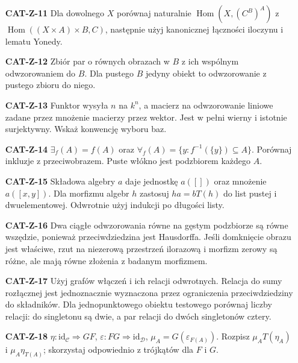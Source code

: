 \documentclass[11pt,a4paper]{article}
\newcommand{\Hom}{\operatorname{Hom}}
\newcommand{\id}{\mathrm{id}}
\begin{document}
\begin{enumerate}
\item[\textbf{CAT-Z-11}] Dla dowolnego $X$ porównaj naturalnie $\Hom(X,(C^B)^A)$ z $\Hom((X\times A)\times B,C)$, następnie użyj kanonicznej łączności iloczynu i lematu Yonedy.
\item[\textbf{CAT-Z-12}] Zbiór par o równych obrazach w $B$ z ich wspólnym odwzorowaniem do $B$. Dla pustego $B$ jedyny obiekt to odwzorowanie z pustego zbioru do niego.
\item[\textbf{CAT-Z-13}] Funktor wysyła $n$ na $k^n$, a macierz na odwzorowanie liniowe zadane przez mnożenie macierzy przez wektor. Jest w pełni wierny i istotnie surjektywny. Wskaż konwencję wyboru baz.
\item[\textbf{CAT-Z-14}] $\exists_f(A)=f(A)$ oraz $\forall_f(A)=\{y:f^{-1}(\{y\})\subseteq A\}$. Porównaj inkluzje z przeciwobrazem. Puste włókno jest podzbiorem każdego $A$.
\item[\textbf{CAT-Z-15}] Składowa algebry $a$ daje jednostkę $a([])$ oraz mnożenie $a([x,y])$. Dla morfizmu algebr $h$ zastosuj $ha=bT(h)$ do list pustej i dwuelementowej. Odwrotnie użyj indukcji po długości listy.
\item[\textbf{CAT-Z-16}] Dwa ciągłe odwzorowania równe na gęstym podzbiorze są równe wszędzie, ponieważ przeciwdziedzina jest Hausdorffa. Jeśli domknięcie obrazu jest właściwe, rzut na niezerową przestrzeń ilorazową i morfizm zerowy są różne, ale mają równe złożenia z badanym morfizmem.
\item[\textbf{CAT-Z-17}] Użyj grafów włączeń i ich relacji odwrotnych. Relacja do sumy rozłącznej jest jednoznacznie wyznaczona przez ograniczenia przeciwdziedziny do składników. Dla jednopunktowego obiektu testowego porównaj liczby relacji: do singletonu są dwie, a par relacji do dwóch singletonów cztery.
\item[\textbf{CAT-Z-18}] $\eta:\id_{\mathcal C}\Rightarrow GF$, $\varepsilon:FG\Rightarrow\id_{\mathcal D}$, $\mu_A=G(\varepsilon_{F(A)})$. Rozpisz $\mu_A T(\eta_A)$ i $\mu_A\eta_{T(A)}$; skorzystaj odpowiednio z trójkątów dla $F$ i $G$.
\end{enumerate}
\end{document}
